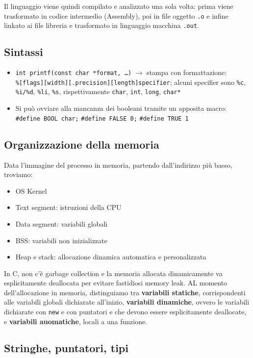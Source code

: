 \documentclass[11pt]{article}
\begin{document}
Il linguaggio viene quindi compilato e analizzato una sola volta: prima viene trasformato in codice intermedio (Assembly), poi in file oggetto \verb|.o| e infine linkato ai file libreria e trasformato in linguaggio macchina \verb|.out|.

\subsection{Sintassi}
\begin{itemize}
    \item\verb|int printf(const char *format, …)| $\rightarrow$ stampa con formattazione:\\ \verb|%[flags][width][.precision][length]specifier|; alcuni specifier sono \verb|%c|, \verb|%i/%d|, \verb|%li|, \verb|%s|, rispettivamente \verb|char|, \verb|int|, \verb|long|, \verb|char*|
    \item Si può ovviare alla mancanza dei booleani tramite un apposita macro: \verb|#define BOOL char;| \verb|#define FALSE 0;| \verb|#define TRUE 1|
\end{itemize}

\subsection{Organizzazione della memoria}

Data l'immagine del processo in memoria, partendo dall'indirizzo più basso, troviamo:
\begin{itemize}
    \item OS Kernel
    \item Text segment: istruzioni della CPU
    \item Data segment: variabili globali
    \item BSS: variabili non inizializzate
    \item Heap e stack: allocazione dinamica automatica e personalizzata
\end{itemize}

In C, non c'è garbage collection e la memoria allocata dinamicamente va esplicitamente deallocata per evitare fastidiosi memory leak. AL momento dell'allocazione in memoria, distinguiamo tra \textbf{variabili statiche}, corrispondenti alle variabili globali dichiarate all'inizio, \textbf{variabili dinamiche}, ovvero le variabili dichiarate con \verb|new| e con puntatori e che devono essere esplicitamente deallocate, e \textbf{variabili auomatiche}, locali a una funzione.

\subsection{Stringhe, puntatori, tipi}
\end{document}
